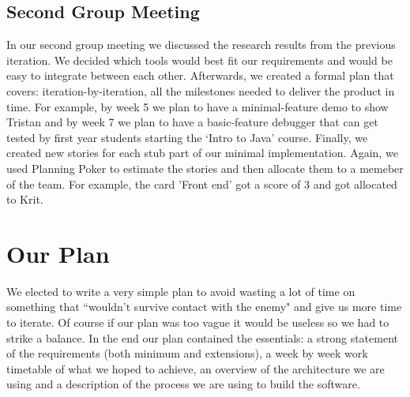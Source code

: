 \documentclass[11pt]{article}
\begin{document}
\subsection{Second Group Meeting}
In our second group meeting we discussed the research results from the previous iteration. We decided which tools would best fit our requirements and would be easy to integrate between each other. Afterwards, we created a formal plan that covers: iteration-by-iteration, all the milestones needed to deliver the product in time. For example, by week 5 we plan to have a minimal-feature demo to show Tristan and by week 7 we plan to have a basic-feature debugger that can get tested by first year students starting the `Intro to Java' course. Finally, we created new stories for each stub part of our minimal implementation. Again, we used Planning Poker to estimate the stories and then allocate them to a memeber of the team. For example, the card 'Front end' got a score of 3 and got allocated to Krit. 

\section{Our Plan}

We elected to write a very simple plan to avoid wasting a lot of time on something that ``wouldn't survive contact with the enemy" and give us more time to iterate. 
Of course if our plan was too vague it would be useless so we had to strike a balance.
In the end our plan contained the essentials: a strong statement of the requirements (both minimum and extensions), a week by week work timetable of what we hoped to achieve, an overview of the architecture we are using and a description of the process we are using to build the software.
\end{document}
